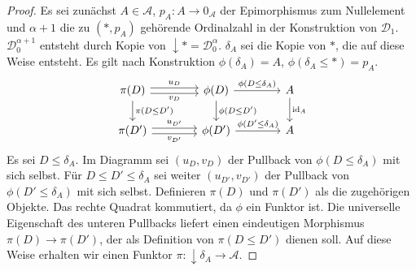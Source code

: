 \documentclass[a4paper, parskip=half,11pt]{scrartcl}
\theoremstyle{marginbreak}
\theoremstyle{nonumberplain}
\newtheorem{proof}{Beweis.}
\newcommand\cat\mathcal
\newcommand{\down}[1]{{\downarrow}#1}
\newcommand{\n}{\pgfmatrixnextcell}
\DeclareMathOperator{\id}{id}
\begin{document}
{\begin{proof}
			Es sei zunächst $A\in\cat{A}$, $p_A\colon A\to 0_\cat{A}$ der Epimorphismus
			zum Nullelement und $\alpha+1$ die zu $(*, p_A)$ gehörende Ordinalzahl
			in der Konstruktion von $\cat{D}_1$. $\cat{D}_0^{\alpha+1}$ entsteht durch
			Kopie von $\down{*}=\cat{D}_0^\alpha$. $\delta_A$ sei die Kopie von $*$,
			die auf diese Weise entsteht. Es gilt nach Konstruktion $\phi(\delta_A)=A$,
			$\phi(\delta_A\leq *)=p_A$.
			\[
				\begin{tikzcd}[column sep=4em]
					\pi(D)
						\ar[shift left]{r}{u_D}
						\ar[shift right, ']{r}{v_D}
						\ar{d}{\pi(D\leq D')} \n
					\phi(D)
						\ar{r}{\phi(D\leq\delta_A)}
						\ar{d}{\phi(D\leq D')} \n
					A
						\ar{d}{\id_A} \\
					\pi(D')
						\ar[shift left]{r}{u_{D'}}
						\ar[shift right, ']{r}{v_{D'}} \n
					\phi(D')
						\ar{r}{\phi(D'\leq\delta_A)} \n
					A
				\end{tikzcd}
			\]
			Es sei $D\leq\delta_A$. Im Diagramm sei $(u_D, v_D)$ der Pullback von $\phi(D\leq\delta_A)$ mit
			sich selbst. Für $D\leq D'\leq\delta_A$ sei weiter $(u_{D'}, v_{D'})$
			der Pullback von $\phi(D'\leq\delta_A)$ mit sich selbst. Definieren
			$\pi(D)$ und $\pi(D')$ als die zugehörigen Objekte. Das rechte
			Quadrat kommutiert, da $\phi$ ein Funktor ist. Die universelle Eigenschaft
			des unteren Pullbacks liefert einen eindeutigen Morphismus $\pi(D)\to\pi(D')$,
			der als Definition von $\pi(D\leq D')$ dienen soll. Auf diese Weise erhalten wir
			einen Funktor $\pi\colon\down{\delta_A}\to\cat{A}$.


\end{proof}}
\end{document}
